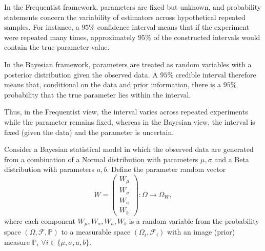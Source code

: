 \begin{remark}
	\label{rem:frequentist_statistics}
	In the Frequentist framework, parameters are fixed but unknown, and probability statements concern the variability of estimators across hypothetical repeated samples. For instance, a $95\%$ confidence interval means that if the experiment were repeated many times, approximately $95\%$ of the constructed intervals would contain the true parameter value. \newline
	
	In the Bayesian framework, parameters are treated as random variables with a posterior distribution given the observed data. A $95\%$ credible interval therefore means that, conditional on the data and prior information, there is a $95\%$ probability that the true parameter lies within the interval.\newline
	
	Thus, in the Frequentist view, the interval varies across repeated experiments while the parameter remains fixed, whereas in the Bayesian view, the interval is fixed (given the data) and the parameter is uncertain.
\end{remark}

\begin{example}
	\label{ex:bayesian_model}
	Consider a Bayesian statistical model in which the observed data are generated from a combination of a Normal distribution with parameters $\mu,\sigma$ and a Beta distribution with parameters $a,b$. Define the parameter random vector
	\begin{equation}
		W = 
		\begin{pmatrix}
			W_\mu \\ W_\sigma \\ W_a \\ W_b
		\end{pmatrix} : \Omega \to \Omega_W,
	\end{equation}
	where each component $W_\mu, W_\sigma, W_a, W_b$ is a random variable from the probability space $(\Omega, \mathcal{F}, \mathbb{P})$ to a measurable space $(\Omega_i, \mathcal{F}_i)$ with an image (prior) measure $\mathbb{P}_i$ $\forall i\in\{\mu,\sigma,a,b\}$.
\end{example}

